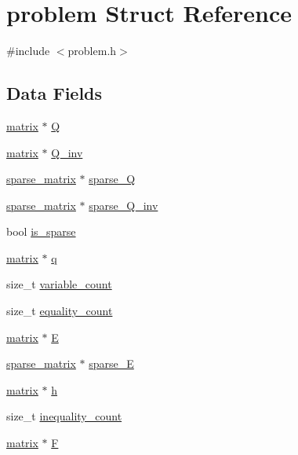 \hypertarget{structproblem}{}\section{problem Struct Reference}
\label{structproblem}


{\ttfamily \#include $<$problem.\+h$>$}

\subsection*{Data Fields}
\begin{DoxyCompactItemize}
\item 
\hyperlink{structmatrix}{matrix} $\ast$ \hyperlink{structproblem_ae50fecd2794ca5844d6d01efcf17294c}{Q}
\item 
\hyperlink{structmatrix}{matrix} $\ast$ \hyperlink{structproblem_a54cc974fe14b21225c2a940ed2bf1039}{Q\+\_\+inv}
\item 
\hyperlink{structsparse__matrix}{sparse\+\_\+matrix} $\ast$ \hyperlink{structproblem_a9016d263d0c353ddccf0857fd8d98d27}{sparse\+\_\+\+Q}
\item 
\hyperlink{structsparse__matrix}{sparse\+\_\+matrix} $\ast$ \hyperlink{structproblem_a4640d285dfaec5b69bd235123350681b}{sparse\+\_\+\+Q\+\_\+inv}
\item 
bool \hyperlink{structproblem_ab67d0346971f5ea4c8c700e4177048ca}{is\+\_\+sparse}
\item 
\hyperlink{structmatrix}{matrix} $\ast$ \hyperlink{structproblem_a7755407fcbd4345b31d64bbc181af35a}{q}
\item 
size\+\_\+t \hyperlink{structproblem_a613329e09fb5f516bd1df88f9570deca}{variable\+\_\+count}
\item 
size\+\_\+t \hyperlink{structproblem_ab1f41a0e1cbb52fb94997615f262fe20}{equality\+\_\+count}
\item 
\hyperlink{structmatrix}{matrix} $\ast$ \hyperlink{structproblem_a1fc7c4b0ad7cae12ae26a243648cec36}{E}
\item 
\hyperlink{structsparse__matrix}{sparse\+\_\+matrix} $\ast$ \hyperlink{structproblem_ac52cb5cf71abac761155349f304f1499}{sparse\+\_\+\+E}
\item 
\hyperlink{structmatrix}{matrix} $\ast$ \hyperlink{structproblem_a8e142e0ead965e30c731cac0c81f0546}{h}
\item 
size\+\_\+t \hyperlink{structproblem_a029a32146b466096a85a0573992327fa}{inequality\+\_\+count}
\item 
\hyperlink{structmatrix}{matrix} $\ast$ \hyperlink{structproblem_a9cba4c914ccb68d2fa56a599049b5d88}{F}

\end{DoxyCompactItemize}

